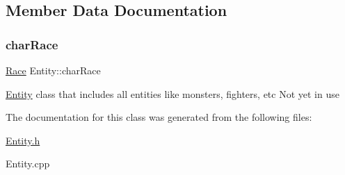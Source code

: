 \subsection{Member Data Documentation}
\hypertarget{class_entity_af1e600508552c74e578dc3258e2175c5}{}\label{class_entity_af1e600508552c74e578dc3258e2175c5} 
\subsubsection{\texorpdfstring{char\+Race}{charRace}}
{\footnotesize\ttfamily \hyperlink{_entity_8h_aa2df4028f474807638d438104900b003}{Race} Entity\+::char\+Race}

\hyperlink{class_entity}{Entity} class that includes all entities like monsters, fighters, etc Not yet in use 

The documentation for this class was generated from the following files\+:\begin{DoxyCompactItemize}
\item 
\hyperlink{_entity_8h}{Entity.\+h}\item 
Entity.\+cpp\end{DoxyCompactItemize}
